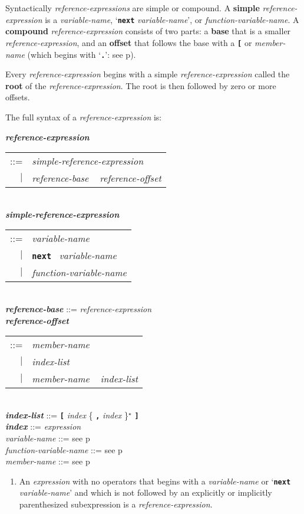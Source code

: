 \documentclass[12pt]{article}
\newcommand{\TT}[1]{{\tt \bfseries #1}}
\newcommand{\STAR}{{\Large $^\star$}}
\newcommand{\key}[1]{{\rm \bfseries #1}}
\newcommand{\emkey}[1]{{\em \bfseries #1}}
\newcommand{\pagref}[1]{p\pageref{#1}}
\newenvironment{indpar}[1][0.3in]%
	{\begin{list}{}%
		     {\setlength{\itemsep}{0in}%
		      \setlength{\topsep}{0in}%
		      \setlength{\parsep}{1ex}%
		      \setlength{\labelwidth}{#1}%
		      \setlength{\leftmargin}{#1}%
		      \addtolength{\leftmargin}{\labelsep}}%
	 \item}%
	{\end{list}}
\begin{document}
Syntactically {\em reference-expressions} are simple or compound.
A \key{simple} {\em reference-expression} is
a {\em variable-name}, `\TT{next} {\em variable-name}', or
{\em function-variable-name}.
A \key{compound} {\em refer\-ence-expression} consists of two parts:
a \key{base} that is a smaller {\em reference-expression},
and an \key{offset} that follows the base with
a \TT{[} or {\em member-name}
(which begins with `\TT{.}': see \pagref{MEMBER-NAME}).

Every {\em reference-expression} begins with a simple
{\em reference-expression} called the \key{root} of the
{\em reference-expression}.  The root is then followed by zero or more
offsets.

The full syntax of a {\em reference-expression} is:

\begin{indpar}
\emkey{reference-expression}\label{REFERENCE-EXPRESSION}
    \begin{tabular}[t]{rl}
    ::= & {\em simple-reference-expression} \\
    $|$ & {\em reference-base} ~ {\em reference-offset} \\
    \end{tabular}
\\[0.5ex]
\emkey{simple-reference-expression}\label{SIMPLE-REFERENCE-EXPRESSION}
    \begin{tabular}[t]{rl}
    ::= & {\em variable-name} \\
    $|$ & \TT{next}~ {\em variable-name} \\
    $|$ & {\em function-variable-name} \\
    \end{tabular}
\\[0.5ex]
\emkey{reference-base}\label{REFERENCE-BASE}
    ::= {\em reference-expression}
\\[0.5ex]
\emkey{reference-offset}\label{REFERENCE-OFFSET}
    \begin{tabular}[t]{rl}
    ::= & {\em member-name} \\
    $|$ & {\em index-list} \\
    $|$ & {\em member-name} ~ {\em index-list} \\
    \end{tabular}
\\[0.5ex]
\emkey{index-list} ::= \TT{[} {\em index} \{ \TT{,} {\em index} \}\STAR{} \TT{]}
\\[0.5ex]
\emkey{index}\label{REFERENCE-INDEX}
    ::= {\em expression}
\\[0.5ex]
{\em variable-name} ::= see \pagref{VARIABLE-NAME}
\\[0.5ex]
{\em function-variable-name} ::= see \pagref{FUNCTION-VARIABLE-NAME}
\\[0.5ex]
{\em member-name} ::= see \pagref{MEMBER-NAME}
\begin{enumerate}
\item
An {\em expression} with no operators that begins
with a {\em variable-name} or `\TT{next} {\em vari\-able-name}'
and which is not followed
by an explicitly or implicitly parenthesized subexpression
is a {\em reference-expression}.


\end{enumerate}
\end{indpar}
\end{document}
